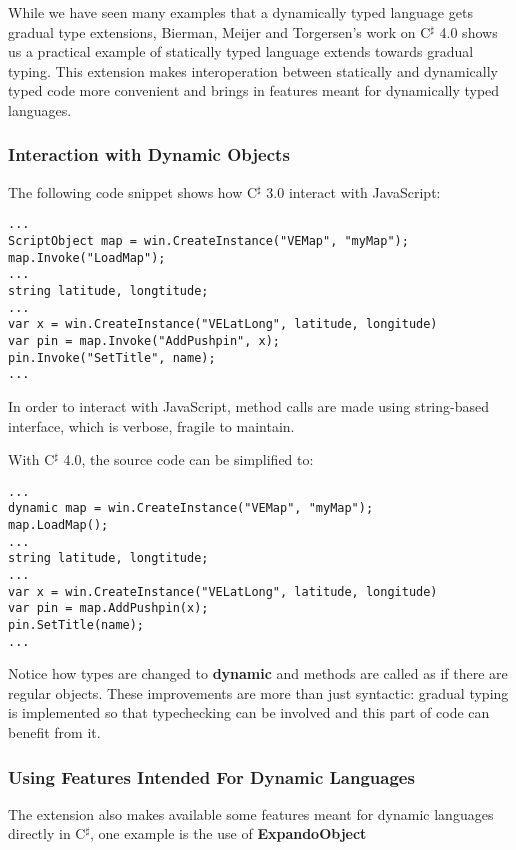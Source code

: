 While we have seen many examples that a dynamically typed language gets
gradual type extensions, Bierman, Meijer and Torgersen's work on
C$^\sharp$ 4.0\cite{meijer2004static} shows us a practical example of statically typed language
extends towards gradual typing.
This extension makes interoperation between statically and dynamically typed code
more convenient and brings in features meant for dynamically typed languages.

\subsubsection{Interaction with Dynamic Objects}

The following code snippet shows how C$^\sharp$ 3.0 interact with JavaScript:

\begin{verbatim}
...
ScriptObject map = win.CreateInstance("VEMap", "myMap");
map.Invoke("LoadMap");
...
string latitude, longtitude;
...
var x = win.CreateInstance("VELatLong", latitude, longitude)
var pin = map.Invoke("AddPushpin", x);
pin.Invoke("SetTitle", name);
...
\end{verbatim}

In order to interact with JavaScript, method calls
are made using string-based interface, which is verbose, fragile to maintain.

With C$^\sharp$ 4.0, the source code can be simplified to:

\begin{verbatim}
...
dynamic map = win.CreateInstance("VEMap", "myMap");
map.LoadMap();
...
string latitude, longtitude;
...
var x = win.CreateInstance("VELatLong", latitude, longitude)
var pin = map.AddPushpin(x);
pin.SetTitle(name);
...
\end{verbatim}

Notice how types are changed to \textbf{dynamic} and methods are called
as if there are regular objects.
These improvements are more than just syntactic: gradual typing is implemented
so that typechecking can be involved and this part of code can benefit from it.

\subsubsection{Using Features Intended For Dynamic Languages}

The extension also makes available some features meant for dynamic languages
directly in C$^\sharp$, one example is the use of \textbf{ExpandoObject}

